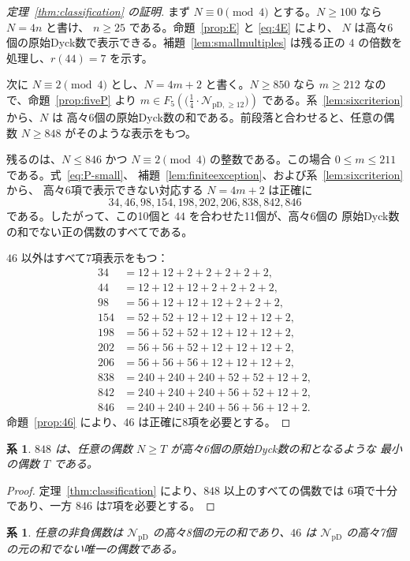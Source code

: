 \documentclass[12pt]{ltjsarticle}
\theoremstyle{plain}
\newtheorem{corollary}[theorem]{系}
\theoremstyle{definition}
\theoremstyle{plain}
\newcommand{\NpD}{\mathcal{N}_{\mathrm{pD}}}
\newcommand{\Pset}{%
  \bigl(\tfrac{1}{4}\cdot\mathcal{N}_{\mathrm{pD},\geq 12}\bigr)%
}
\begin{document}
\begin{proof}[定理~\ref{thm:classification} の証明]
まず $N\equiv0\pmod4$ とする。$N\geq100$ なら $N=4n$ と書け、
$n\geq25$ である。命題~\ref{prop:E} と \eqref{eq:4E} により、
$N$ は高々6個の原始Dyck数で表示できる。補題~\ref{lem:smallmultiples}
は残る正の $4$ の倍数を処理し、$r(44)=7$ を示す。

次に $N\equiv2\pmod4$ とし、$N=4m+2$ と書く。$N\geq850$ なら
$m\geq212$ なので、命題~\ref{prop:fiveP} より
$m\in F_5(\Pset)$ である。系~\ref{lem:sixcriterion} から、$N$ は
高々6個の原始Dyck数の和である。前段落と合わせると、任意の偶数
$N\geq848$ がそのような表示をもつ。

残るのは、$N\leq846$ かつ $N\equiv2\pmod4$ の整数である。この場合
$0\leq m\leq211$ である。式~\eqref{eq:P-small}、
補題~\ref{lem:finiteexception}、および系~\ref{lem:sixcriterion} から、
高々6項で表示できない対応する $N=4m+2$ は正確に
\[
 34,46,98,154,198,202,206,838,842,846
\]
である。したがって、この10個と $44$ を合わせた11個が、高々6個の
原始Dyck数の和でない正の偶数のすべてである。

$46$ 以外はすべて7項表示をもつ：
\[
\begin{aligned}
34&=12+12+2+2+2+2+2,\\
44&=12+12+12+2+2+2+2,\\
98&=56+12+12+12+2+2+2,\\
154&=52+52+12+12+12+12+2,\\
198&=56+52+52+12+12+12+2,\\
202&=56+56+52+12+12+12+2,\\
206&=56+56+56+12+12+12+2,\\
838&=240+240+240+52+52+12+2,\\
842&=240+240+240+56+52+12+2,\\
846&=240+240+240+56+56+12+2.
\end{aligned}
\]
命題~\ref{prop:46} により、$46$ は正確に8項を必要とする。
\end{proof}

\begin{corollary}\label{cor:threshold}
$848$ は、任意の偶数 $N\geq T$ が高々6個の原始Dyck数の和となるような
最小の偶数 $T$ である。
\end{corollary}

\begin{proof}
定理~\ref{thm:classification} により、$848$ 以上のすべての偶数では
6項で十分であり、一方 $846$ は7項を必要とする。
\end{proof}

\begin{corollary}\label{cor:eight}
任意の非負偶数は $\NpD$ の高々8個の元の和であり、$46$ は
$\NpD$ の高々7個の元の和でない唯一の偶数である。
\end{corollary}
\end{document}
